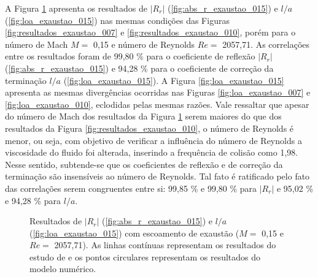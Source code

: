 A Figura \ref{fig:resultados_exaustao_015} apresenta os resultados de $|R_{r}|$ (\ref{fig:abs_r_exaustao_015}) e  $l/a$ (\ref{fig:loa_exaustao_015}) nas mesmas condições das Figuras \ref{fig:resultados_exaustao_007} e \ref{fig:resultados_exaustao_010}, porém para o número de Mach $M =$ 0,15 e número de Reynolds $Re =$ 2057,71.  As correlações entre os resultados foram de 99,80 \% para o coeficiente de reflexão $|R_{r}|$ (\ref{fig:abs_r_exaustao_015}) e 94,28 \% para o coeficiente de correção da terminação $l/a$ (\ref{fig:loa_exaustao_015}). A Figura \ref{fig:loa_exaustao_015} apresenta as mesmas divergências ocorridas nas Figuras \ref{fig:loa_exaustao_007} e \ref{fig:loa_exaustao_010}, eclodidas pelas mesmas razões. Vale ressaltar que apesar do número de Mach dos resultados da Figura \ref{fig:resultados_exaustao_015} serem maiores do que dos resultados da Figura \ref{fig:resultados_exaustao_010}, o número de Reynolds é menor, ou seja, com objetivo de verificar a influência do número de Reynolds a viscosidade do fluido foi alterada, inserindo a frequência de colisão como 1,98. Nesse sentido, subtende-se que os coeficientes de reflexão e de correção da terminação são insensíveis ao número de Reynolds. Tal fato é ratificado pelo fato das correlações serem congruentes entre si: 99,85 \% e 99,80 \% para $|R_{r}|$ e 95,02 \% e 94,28 \% para $l/a$.

\begin{figure}[ht!]
\begin{subfigure}{\scaleA \textwidth}
  
\end{subfigure}%
\begin{subfigure}{\scaleA \textwidth}
  
\end{subfigure}
\caption[Resultados de $|R_{r}|$ e $l/a$ com escoamento de exaustão (M $=$ 0,15 e Re $=$ 2057,71)]{Resultados de $|R_{r}|$ (\ref{fig:abs_r_exaustao_015}) e $l/a$ (\ref{fig:loa_exaustao_015}) com escoamento de exaustão ($M =$ 0,15 e $Re =$ 2057,71). As linhas contínuas representam os resultados do estudo de  e os pontos circulares representam os resultados do modelo numérico.}
\label{fig:resultados_exaustao_015}
\end{figure}



